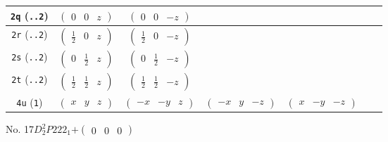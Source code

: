 \documentclass[fleqn,9pt,landscape]{jsarticle}
\begin{document}
\begin{center}
\begin{longtable}{ccccccc}
{\tt 2q} ({\tt ..2}) & $ \begin{pmatrix} 0 & 0 & z \end{pmatrix} $ & $ \begin{pmatrix} 0 & 0 & - z \end{pmatrix} $ & $  $ & $  $ \\ \hline
{\tt 2r} ({\tt ..2}) & $ \begin{pmatrix} \frac{1}{2} & 0 & z \end{pmatrix} $ & $ \begin{pmatrix} \frac{1}{2} & 0 & - z \end{pmatrix} $ & $  $ & $  $ \\ \hline
{\tt 2s} ({\tt ..2}) & $ \begin{pmatrix} 0 & \frac{1}{2} & z \end{pmatrix} $ & $ \begin{pmatrix} 0 & \frac{1}{2} & - z \end{pmatrix} $ & $  $ & $  $ \\ \hline
{\tt 2t} ({\tt ..2}) & $ \begin{pmatrix} \frac{1}{2} & \frac{1}{2} & z \end{pmatrix} $ & $ \begin{pmatrix} \frac{1}{2} & \frac{1}{2} & - z \end{pmatrix} $ & $  $ & $  $ \\ \hline
{\tt 4u} ({\tt 1}) & $ \begin{pmatrix} x & y & z \end{pmatrix} $ & $ \begin{pmatrix} - x & - y & z \end{pmatrix} $ & $ \begin{pmatrix} - x & y & - z \end{pmatrix} $ & $ \begin{pmatrix} x & - y & - z \end{pmatrix} $ \\
\end{longtable}
\end{center}
\newpage
No. 17\quad$D_{2}^{2}$\quad$P222_1$\quad[ orthorhombic ]\quad$+\begin{pmatrix} 0 & 0 & 0 \end{pmatrix}$
\end{document}
